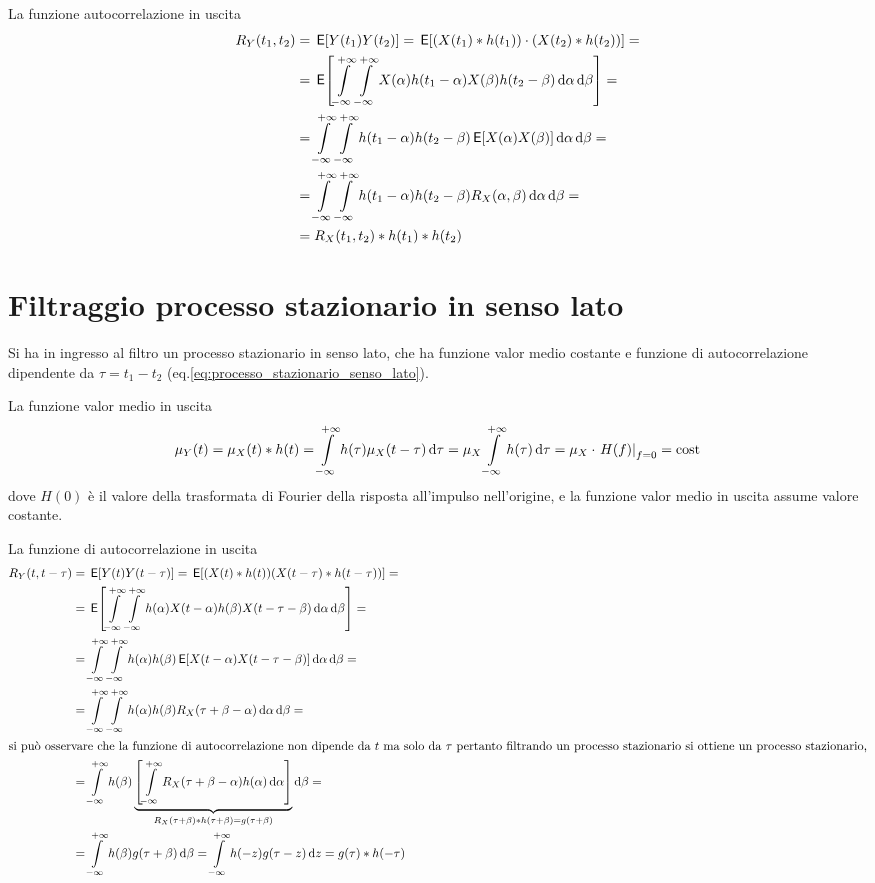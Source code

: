 La funzione autocorrelazione in uscita
\begin{equation}
\begin{split}
	R_Y(t_1,t_2)&=\E{Y(t_1)Y(t_2)}=\E{(X(t_1)\ast h(t_1))\cdot(X(t_2)\ast h(t_2))}=\\
	&=\E{\intinf{\intinf{X(\alpha)h(t_1-\alpha)X(\beta)h(t_2-\beta)}{\alpha}}{\beta}}=\\
	&=\intinf{\intinf{h(t_1-\alpha)h(t_2-\beta)\E{X(\alpha)X(\beta)}}{\alpha}}{\beta}=\\
	&=\intinf{\intinf{h(t_1-\alpha)h(t_2-\beta)R_X(\alpha,\beta)}{\alpha}}{\beta}=\\
	&=R_X(t_1,t_2)\ast h(t_1)\ast h(t_2)
\end{split}
\end{equation}

\section{Filtraggio processo stazionario in senso lato}
\label{sec:filtraggio_processo_SSL}
Si ha in ingresso al filtro un processo stazionario in senso lato, che ha funzione valor medio costante e funzione di autocorrelazione dipendente da $\tau=t_1-t_2$ (eq.\ref{eq:processo_stazionario_senso_lato}).

La funzione valor medio in uscita
\begin{equation}
	\mu_Y(t)=\mu_X(t)\ast h(t)=\int\limits_{-\infty}^{+\infty}{h(\tau)\mu_X(t-\tau)}{\,\mathop{}\!\mathrm{d}{\tau}}=\mu_X\int\limits_{-\infty}^{+\infty}{h(\tau)}{\,\mathop{}\!\mathrm{d}{\tau}}=\mu_X\cdot \left.{H(f)}\right\rvert_{f=0}=\text{cost}
\end{equation}
dove $H(0)$ è il valore della trasformata di Fourier della risposta all'impulso nell'origine, e la funzione valor medio in uscita assume valore costante.

La funzione di autocorrelazione in uscita
\begin{align*}
	R_Y(t,t-\tau)&=\E{Y(t)Y(t-\tau)}=\E{(X(t)\ast h(t))(X(t-\tau)\ast h(t-\tau))}=\\&=\E{\intinf{\intinf{h(\alpha)X(t-\alpha)h(\beta)X(t-\tau-\beta)}{\alpha}}{\beta}}=\\&=\intinf{\intinf{h(\alpha)h(\beta)\E{X(t-\alpha)X(t-\tau-\beta)}}{\alpha}}{\beta}=\\&=\intinf{\intinf{h(\alpha)h(\beta)R_X(\tau+\beta-\alpha)}{\alpha}}{\beta}=\\
	\intertext{si può osservare che la funzione di autocorrelazione non dipende da $t$ ma solo da $\tau$ pertanto filtrando un processo stazionario si ottiene un processo stazionario,}
	&=\intinf{h(\beta)\underbrace{\left[\intinf{R_X(\tau+\beta-\alpha)h(\alpha)}{\alpha}\right]}_{R_X(\tau+\beta)\ast h(\tau+\beta)=g(\tau+\beta)}}{\beta}=\\
	&=\intinf{h(\beta)g(\tau+\beta)}{\beta}=\intinf{h(-z)g(\tau-z)}{z}=g(\tau)\ast h(-\tau)
\end{align*}

